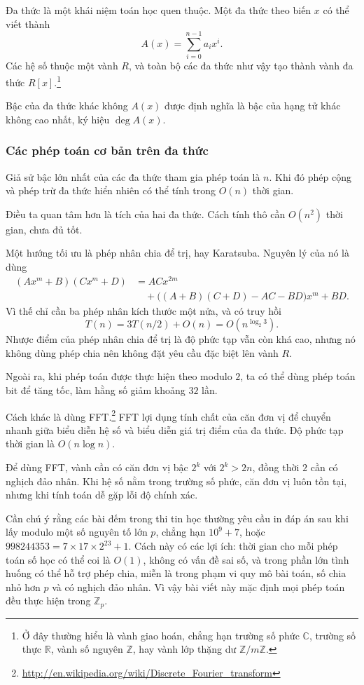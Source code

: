 \documentclass[11pt]{article}
\begin{document}
Đa thức là một khái niệm toán học quen thuộc. Một đa thức theo biến \(x\) có
thể viết thành
\[
  A(x)=\sum_{i=0}^{n-1} a_i x^i. \tag{2.1}
\]
Các hệ số thuộc một vành \(R\), và toàn bộ các đa thức như vậy tạo thành vành
đa thức \(R[x]\).\footnote{Ở đây thường hiểu là vành giao hoán, chẳng hạn
trường số phức \(\mathbb C\), trường số thực \(\mathbb R\), vành số nguyên
\(\mathbb Z\), hay vành lớp thặng dư \(\mathbb Z/m\mathbb Z\).}

Bậc của đa thức khác không \(A(x)\) được định nghĩa là bậc của hạng tử khác
không cao nhất, ký hiệu \(\deg A(x)\).

\subsubsection{Các phép toán cơ bản trên đa thức}

Giả sử bậc lớn nhất của các đa thức tham gia phép toán là \(n\). Khi đó phép
cộng và phép trừ đa thức hiển nhiên có thể tính trong \(O(n)\) thời gian.

Điều ta quan tâm hơn là tích của hai đa thức. Cách tính thô cần \(O(n^2)\) thời
gian, chưa đủ tốt.

Một hướng tối ưu là phép nhân chia để trị, hay Karatsuba. Nguyên lý của nó là
dùng
\[
\begin{aligned}
  (Ax^m+B)(Cx^m+D)
  &= ACx^{2m}\\
  &\quad+\bigl((A+B)(C+D)-AC-BD\bigr)x^m+BD.
\end{aligned}
\]
Vì thế chỉ cần ba phép nhân kích thước một nửa, và có truy hồi
\[
  T(n)=3T(n/2)+O(n)=O(n^{\log_2 3}).
\]
Nhược điểm của phép nhân chia để trị là độ phức tạp vẫn còn khá cao, nhưng nó
không dùng phép chia nên không đặt yêu cầu đặc biệt lên vành \(R\).

Ngoài ra, khi phép toán được thực hiện theo modulo \(2\), ta có thể dùng phép
toán bit để tăng tốc, làm hằng số giảm khoảng \(32\) lần.

Cách khác là dùng FFT.\footnote{\url{http://en.wikipedia.org/wiki/Discrete\_Fourier\_transform}}
FFT lợi dụng tính chất của căn đơn vị để chuyển nhanh giữa biểu diễn hệ số và
biểu diễn giá trị điểm của đa thức. Độ phức tạp thời gian là \(O(n\log n)\).

Để dùng FFT, vành cần có căn đơn vị bậc \(2^k\) với \(2^k>2n\), đồng thời \(2\)
cần có nghịch đảo nhân. Khi hệ số nằm trong trường số phức, căn đơn vị luôn tồn
tại, nhưng khi tính toán dễ gặp lỗi độ chính xác.

Cần chú ý rằng các bài đếm trong thi tin học thường yêu cầu in đáp án sau khi
lấy modulo một số nguyên tố lớn \(p\), chẳng hạn \(10^9+7\), hoặc
\(998244353=7\times 17\times 2^{23}+1\). Cách này có các lợi ích: thời gian cho
mỗi phép toán số học có thể coi là \(O(1)\), không có vấn đề sai số, và trong
phần lớn tình huống có thể hỗ trợ phép chia, miễn là trong phạm vi quy mô bài
toán, số chia nhỏ hơn \(p\) và có nghịch đảo nhân. Vì vậy bài viết này mặc định
mọi phép toán đều thực hiện trong \(\mathbb Z_p\).
\end{document}
